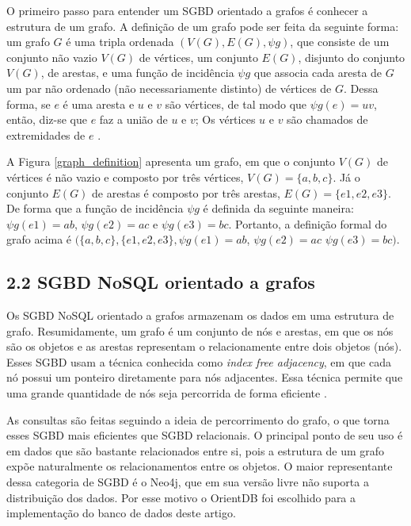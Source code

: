 \documentclass[12pt]{article}
\begin{document}
O primeiro passo para entender um SGBD orientado a grafos é conhecer a estrutura de um grafo. A definição de um grafo pode ser feita da seguinte forma: um grafo \(G\) é uma tripla ordenada \((V(G), E(G), \psi g)\), que consiste de um conjunto não vazio \(V(G)\) de vértices, um conjunto \(E(G)\), disjunto do conjunto \(V(G)\), de arestas, e uma função de incidência \(\psi g\) que associa cada aresta de \(G\) um par não ordenado (não necessariamente distinto) de vértices de \(G\). Dessa forma, se \(e\) é uma aresta e \(u\) e \(v\) são vértices, de tal modo que \(\psi g(e) = uv\), então, diz-se que \(e\) faz a união de \(u\) e \(v\); Os vértices \(u\) e \(v\) são chamados de extremidades de \(e\) \cite{bondy1976graph}.

	A Figura \ref{graph_definition} apresenta um grafo, em que o conjunto \(V(G)\) de vértices é não vazio e composto por três vértices, \(V(G)=\{a,b,c\}\). Já o conjunto \(E(G)\) de arestas é composto por três arestas, \(E(G)=\{e1,e2,e3\}\). De forma que a função de incidência \(\psi g\) é definida da seguinte maneira: \(\psi g(e1)= ab\), \(\psi g(e2)= ac\) e \(\psi g(e3)= bc\). Portanto, a definição formal do grafo acima é \((\{a,b,c\}, \{e1,e2,e3\}, \psi g(e1)= ab\), \(\psi g(e2)= ac\) \(\psi g(e3)= bc)\).
	
\subsection{2.2 SGBD NoSQL orientado a grafos} \label{sec:grafoSGBD}

Os SGBD NoSQL orientado a grafos armazenam os dados em uma estrutura de grafo. Resumidamente, um grafo é um conjunto de nós e arestas, em que os nós são os objetos e as arestas representam o relacionamente entre dois objetos (nós). Esses SGBD usam a técnica conhecida como  \textit{index free adjacency}, em que cada nó possui um ponteiro diretamente para nós adjacentes. Essa técnica permite que uma grande quantidade de nós seja percorrida de forma eficiente \cite{nayak2013type}.
	
	As consultas são feitas seguindo a ideia de percorrimento do grafo, o que torna esses SGBD mais eficientes que SGBD relacionais. O principal ponto de seu uso é em dados que são bastante relacionados entre si, pois a estrutura de um grafo expõe naturalmente os relacionamentos entre os objetos. O maior representante dessa categoria de SGBD é o Neo4j, que em sua versão livre não suporta a distribuição dos dados. Por esse motivo o OrientDB foi escolhido para a implementação do banco de dados deste artigo.
	
\end{document}
